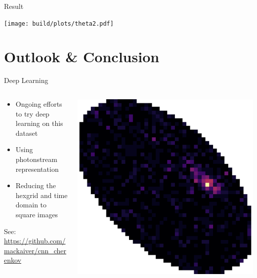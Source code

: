 \documentclass[compress, 9pt, aspectratio=1610, professionalfonts]{beamer}
\begin{document}
\begin{frame}[t]{Result}
  \begin{center}
    \texttt{[image: build/plots/theta2.pdf]}
  \end{center}
\end{frame}

\section{Outlook \& Conclusion}

\begin{frame}[t]{Deep Learning}
  \begin{columns}[onlytextwidth]
    \begin{column}{0.55\textwidth}
      \begin{itemize}
        \item Ongoing efforts to try deep learning on this dataset
        \item Using photonstream representation
        \item Reducing the hexgrid and time domain to square images
      \end{itemize}

      See: \url{https://github.com/mackaiver/cnn_cherenkov}
    \end{column}
    \begin{column}{0.4\textwidth}
      \includegraphics[width=\textwidth]{images/shower_skewed.png}
    \end{column}
  \end{columns}
\end{frame}
\end{document}
